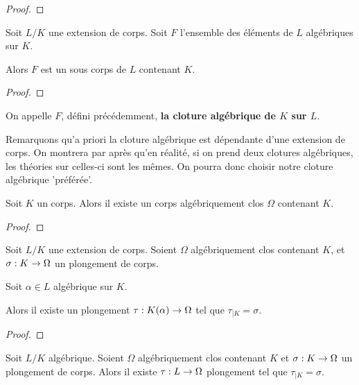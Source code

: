 \ifdefined\outputproof
\begin{proof}

\end{proof}
\fi

\begin{proposition}
	Soit $L/K$ une extension de corps.
	Soit $F$ l'ensemble des éléments de $L$ algébriques sur $K$.

	Alors $F$ est un sous corps de $L$ contenant $K$.
\end{proposition}

\ifdefined\outputproof
\begin{proof}

\end{proof}
\fi

\begin{definition}
	On appelle $F$, défini précédemment, \textbf{la cloture algébrique de $K$
	sur $L$}.
\end{definition}

Remarquons qu'a priori la cloture algébrique est dépendante d'une extension de
corps. On montrera par après qu'en réalité, si on prend deux clotures
algébriques, les théories sur celles-ci sont les mêmes. On pourra donc choisir
notre cloture algébrique 'préférée'.

\begin{theorem}
	Soit $K$ un corps. Alors il existe un corps algébriquement clos $\Omega$
	contenant $K$.
\end{theorem}

\ifdefined\outputproof
\begin{proof}

\end{proof}
\fi

\begin{lemma}
	Soit $L/K$ une extension de corps. Soient $\Omega$ algébriquement clos
	contenant $K$, et
	$\sigma : K \rightarrow \Omega$ un plongement de corps.

	Soit $\alpha \in L$ algébrique sur $K$.

	Alors il existe un plongement $\tau : K(\alpha) \rightarrow \Omega$ tel que
	$\tau_{|K} = \sigma$.
\end{lemma}

\ifdefined\outputproof
\begin{proof}

\end{proof}
\fi

\begin{theorem} 
	Soit $L/K$ algébrique.
	Soient $\Omega$ algébriquement clos contenant $K$ et
	$\sigma : K \rightarrow \Omega$ un plongement de corps.
	Alors il existe $\tau : L \rightarrow \Omega$ plongement tel que $\tau_{|K}
	= \sigma$.
\end{theorem}

